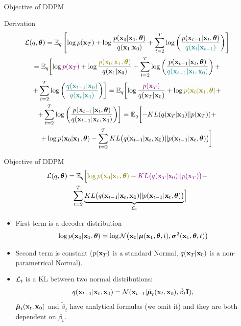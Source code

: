 \begin{frame}{Objective of DDPM}
	\begin{block}{Derivation}
		{\small
		\begin{multline*}
			\cL(q, \btheta) = \bbE_{q} \left[ \log p(\bx_T) + \log \frac{p(\bx_0 | \bx_1, \btheta)}{q(\bx_1 | \bx_0)}  + \sum_{t=2}^T \log \left( \frac{p(\bx_{t-1} | \bx_t, \btheta)}{{\color{teal}q(\bx_t | \bx_{t-1})}}\right)\right] \\ 
			= \bbE_{q} \biggl[  \log {\color{violet} p(\bx_T)} + \log \frac{{\color{olive}p(\bx_0 | \bx_1, \btheta)}}{q(\bx_1 | \bx_0)}  + \sum_{t=2}^T \log \left( \frac{p(\bx_{t-1} | \bx_t, \btheta)}{{\color{teal} q(\bx_{t-1}|\bx_{t}, \bx_0)}}\right) + \\ 
			+ \sum_{t=2}^T \log \left( \frac{{\color{teal} q(\bx_{t-1}|\bx_{0})}}{{\color{teal} q(\bx_{t}| \bx_0)}}\right) \biggr] = \bbE_{q} \biggl[ \log \frac{{\color{violet} p(\bx_T)}}{q(\bx_T | \bx_0)} + \log {\color{olive}p(\bx_0 | \bx_1, \btheta)} + \\
			 + \sum_{t=2}^T \log \left( \frac{p(\bx_{t-1} | \bx_t, \btheta)}{q(\bx_{t-1}|\bx_{t}, \bx_0)}\right) \biggr] = \bbE_{q} \biggl[ - KL(q(\bx_T | \bx_0) || p(\bx_T)) + \\
			 + \log p(\bx_0 | \bx_1, \btheta) - \sum_{t=2}^T  KL\bigl( q(\bx_{t-1}|\bx_{t}, \bx_0) || p(\bx_{t-1} | \bx_t, \btheta)\bigr) \biggr]
		\end{multline*}
		}
		\vspace{-0.3cm}
	\end{block}
\end{frame}
\begin{frame}{Objective of DDPM}
		\vspace{-0.6cm}
		\begin{multline*}
			\cL(q, \btheta) =  \bbE_{q} \Bigl[ {\color{olive}\log p(\bx_0 | \bx_1, \btheta)} - {\color{violet}KL\bigl(q(\bx_T | \bx_0) || p(\bx_T)\bigr)} - \\
			- \sum_{t=2}^T \underbrace{KL \bigl(q(\bx_{t-1} | \bx_t, \bx_0) || p(\bx_{t - 1} | \bx_t, \btheta )\bigr)}_{\cL_t} \Bigr]
		\end{multline*}
		\vspace{-0.5cm}
	\begin{itemize}
		\item {\color{olive}First term} is a decoder distribution
		\[
			\log p(\mathbf{x}_0 | \mathbf{x}_1, \boldsymbol{\theta}) = \log \mathcal{N} \bigl(\mathbf{x}_0 | \boldsymbol{\mu}(\mathbf{x}_1, \boldsymbol{\theta}, t), \boldsymbol{\sigma}^2(\mathbf{x}_1, \boldsymbol{\theta}, t)\bigr)
		\] 
		\item {\color{violet}Second term} is constant ($p(\mathbf{x}_T)$ is a standard Normal, $q(\mathbf{x}_T | \mathbf{x}_0)$ is a non-parametrical Normal).
		\item $\mathcal{L}_t$ is a KL between two normal distributions:
		\[
			q(\mathbf{x}_{t-1} | \mathbf{x}_t, \mathbf{x}_0) = \mathcal{N}(\mathbf{x}_{t-1} | \tilde{\boldsymbol{\mu}}_t(\mathbf{x}_t, \mathbf{x}_0), \tilde{\beta}_t \mathbf{I}),
		\]
		$\tilde{\boldsymbol{\mu}}_t(\mathbf{x}_t, \mathbf{x}_0)$ and $\tilde{\beta}_t$ have analytical formulas (we omit it) and they are both dependent on $\beta_t$.
	\end{itemize}
\end{frame}
